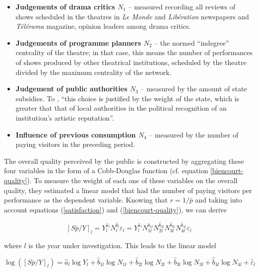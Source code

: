 \documentclass[a4paper, 12pt, openright, oneside, german, french, brazil, english]{abntex2}
\begin{document}
	
	\begin{itemize}
		\item \textbf{Judgements of drama critics $N_1$} -- measured recording all reviews of shows scheduled in the theatres in \textit{Le Monde} and \textit{Libération} newspapers and \textit{Télérama} magazine, opinion leaders among drama critics.
		
		\item \textbf{Judgements of programme planners $N_2$} -- the normed ``indegree'' centrality of the theatre; in that case, this means the number of performances of shows produced by other theatrical institutions, scheduled by the theatre divided by the maximum centrality of the network.
		
		\item \textbf{Judgement of public authorities $N_3$} -- measured by the amount of state subsidies. To , ``this choice is justified by the weight of the state, which is greater that that of local authorities in the political recognition of an institution's artistic reputation''.
		
		\item \textbf{Influence of previous consumption $N_4$} -- measured by the number of paying visitors in the preceding period.
	\end{itemize}
	
	The overall quality perceived by the public is constructed by aggregating these four variables in the form of a Cobb-Douglas function (cf. equation \ref{biencourt-quality}). To measure the weight of each one of these variables on the overall quality, they estimated a linear model that had the number of paying visitors per performance as the dependent variable. Knowing that $r = 1/\bar{p}$ and taking into account equations (\ref{satisfaction}) and (\ref{biencourt-quality}), we can derive
	
	\begin{equation}
	\label{biencourt-derivation}
		[S\bar{p}/Y]_l = Y_{l}^{\hat{a}_l} N_{l}^{\hat{b}_l} \varepsilon_l = Y_{l}^{\hat{a}_l} N_{1l}^{\hat{b}_{1l}} N_{2l}^{\hat{b}_{2l}} N_{3l}^{\hat{b}_{3l}} N_{4l}^{\hat{b}_{4l}} \varepsilon_l
	\end{equation}
	
	where $l$ is the year under investigation. This leads to the linear model
	
	\begin{equation}
	\label{regression}
		\log([S\bar{p}/Y]_l) = \hat{a}_l \log Y_l + \hat{b}_{1l} \log N_{1l} + \hat{b}_{2l} \log N_{2l} + \hat{b}_{3l} \log N_{3l} + \hat{b}_{4l} \log N_{4l} + \hat{\varepsilon}_l
	\end{equation}
	
\end{document}
